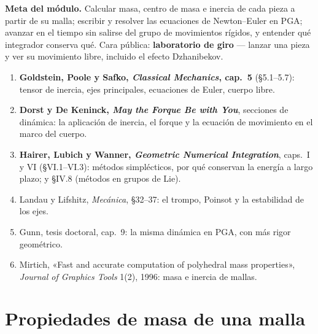 \documentclass[11pt,a4paper]{article}
\begin{document}
\maketitle
\vspace{-2.5em}

\begin{meta}
\textbf{\textcolor{amarillo}{Meta del módulo.}} Calcular masa, centro de masa e inercia de cada pieza a partir de su
malla; escribir y resolver las ecuaciones de Newton–Euler en PGA; avanzar en el tiempo sin salirse del grupo de
movimientos rígidos, y entender qué integrador conserva qué. Cara pública: \textbf{laboratorio de giro} — lanzar una
pieza y ver su movimiento libre, incluido el efecto Dzhanibekov.
\end{meta}

\begin{lectura}
\begin{enumerate}[leftmargin=*]
  \item \textbf{Goldstein, Poole y Safko, \emph{Classical Mechanics}, cap.~5} (§5.1--5.7): tensor de inercia, ejes
        principales, ecuaciones de Euler, cuerpo libre.
  \item \textbf{Dorst y De Keninck, \emph{May the Forque Be with You}}, secciones de dinámica: la aplicación de
        inercia, el forque y la ecuación de movimiento en el marco del cuerpo.
  \item \textbf{Hairer, Lubich y Wanner, \emph{Geometric Numerical Integration}}, caps.~I y VI (§VI.1--VI.3):
        métodos simplécticos, por qué conservan la energía a largo plazo; y §IV.8 (métodos en grupos de Lie).
  \item Landau y Lifshitz, \emph{Mecánica}, §32--37: el trompo, Poinsot y la estabilidad de los ejes.
  \item Gunn, tesis doctoral, cap.~9: la misma dinámica en PGA, con más rigor geométrico.
  \item Mirtich, «Fast and accurate computation of polyhedral mass properties», \emph{Journal of Graphics Tools}
        1(2), 1996: masa e inercia de mallas.
\end{enumerate}
\end{lectura}

\section{Propiedades de masa de una malla}
\end{document}
